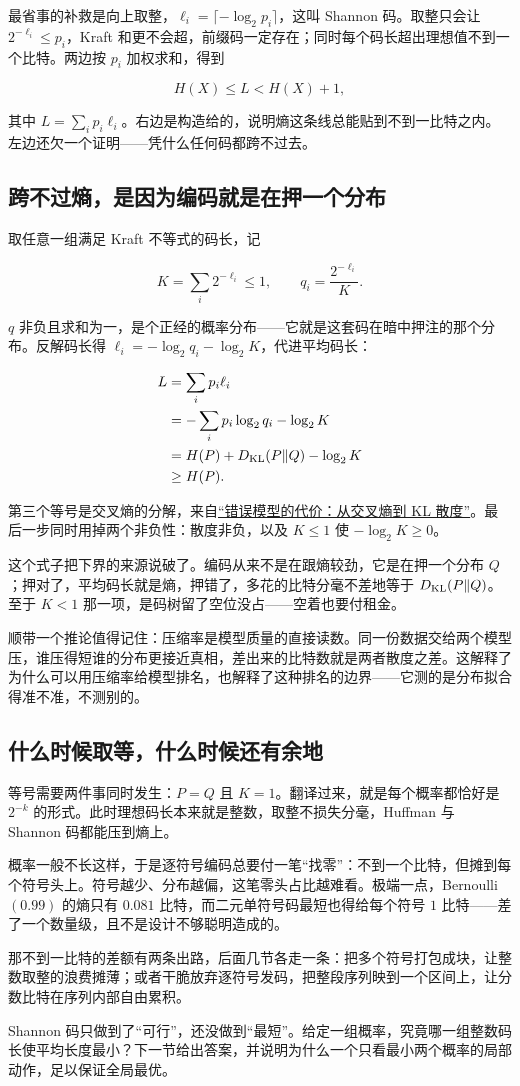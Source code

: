 最省事的补救是向上取整，\(\ell_i=\lceil-\log_2 p_i\rceil\)，这叫 Shannon 码。取整只会让 \(2^{-\ell_i}\le p_i\)，Kraft 和更不会超，前缀码一定存在；同时每个码长超出理想值不到一个比特。两边按 \(p_i\) 加权求和，得到

\[
H(X)\le L<H(X)+1,
\]

其中 \(L=\sum_i p_i\ell_i\)。右边是构造给的，说明熵这条线总能贴到不到一比特之内。左边还欠一个证明——凭什么任何码都跨不过去。

\subsection{跨不过熵，是因为编码就是在押一个分布}

取任意一组满足 Kraft 不等式的码长，记

\[
K=\sum_i 2^{-\ell_i}\le 1,\qquad q_i=\frac{2^{-\ell_i}}{K}.
\]

\(q\) 非负且求和为一，是个正经的概率分布——它就是这套码在暗中押注的那个分布。反解码长得 \(\ell_i=-\log_2 q_i-\log_2 K\)，代进平均码长：

\[
\begin{aligned}
L&=\sum_i p_i\ell_i\\
 &=-\sum_i p_i\log_2 q_i-\log_2 K\\
 &=H(P)+D_{\mathrm{KL}}(P\|Q)-\log_2 K\\
 &\ge H(P).
\end{aligned}
\]

第三个等号是交叉熵的分解，来自\hyperref[sec:07-Information-Theory/03-Divergences/01]{``错误模型的代价：从交叉熵到 KL 散度''}。最后一步同时用掉两个非负性：散度非负，以及 \(K\le1\) 使 \(-\log_2 K\ge0\)。

这个式子把下界的来源说破了。编码从来不是在跟熵较劲，它是在押一个分布 \(Q\)；押对了，平均码长就是熵，押错了，多花的比特分毫不差地等于 \(D_{\mathrm{KL}}(P\|Q)\)。至于 \(K<1\) 那一项，是码树留了空位没占——空着也要付租金。

顺带一个推论值得记住：压缩率是模型质量的直接读数。同一份数据交给两个模型压，谁压得短谁的分布更接近真相，差出来的比特数就是两者散度之差。这解释了为什么可以用压缩率给模型排名，也解释了这种排名的边界——它测的是分布拟合得准不准，不测别的。

\subsection{什么时候取等，什么时候还有余地}

等号需要两件事同时发生：\(P=Q\) 且 \(K=1\)。翻译过来，就是每个概率都恰好是 \(2^{-k}\) 的形式。此时理想码长本来就是整数，取整不损失分毫，Huffman 与 Shannon 码都能压到熵上。

概率一般不长这样，于是逐符号编码总要付一笔``找零''：不到一个比特，但摊到每个符号头上。符号越少、分布越偏，这笔零头占比越难看。极端一点，Bernoulli\((0.99)\) 的熵只有 \(0.081\) 比特，而二元单符号码最短也得给每个符号 \(1\) 比特——差了一个数量级，且不是设计不够聪明造成的。

那不到一比特的差额有两条出路，后面几节各走一条：把多个符号打包成块，让整数取整的浪费摊薄；或者干脆放弃逐符号发码，把整段序列映到一个区间上，让分数比特在序列内部自由累积。

Shannon 码只做到了``可行''，还没做到``最短''。给定一组概率，究竟哪一组整数码长使平均长度最小？下一节给出答案，并说明为什么一个只看最小两个概率的局部动作，足以保证全局最优。
